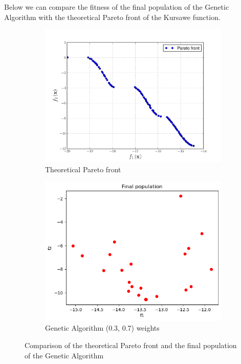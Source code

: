 Below we can compare the fitness of the final population of the Genetic Algorithm with the theoretical Pareto front of the Kursawe function.

\begin{figure}[H]
    \begin{subfigure}{0.5\textwidth}
        \includegraphics[width=\textwidth]{lab8/imgs/kursawe_theory.png}
        \caption{Theoretical Pareto front}
    \end{subfigure}
    \begin{subfigure}{0.5\textwidth}
        \includegraphics[width=\textwidth]{lab8/imgs/kursawe_ga.png}
        \caption{Genetic Algorithm (0.3, 0.7) weights}
    \end{subfigure}
    \label{fig:kursawe_ga}
    \caption{Comparison of the theoretical Pareto front and the final population of the Genetic Algorithm}
\end{figure}

